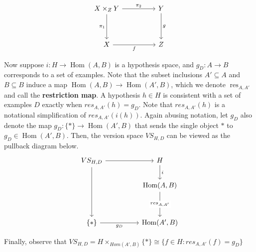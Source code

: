 \documentclass{article}
\theoremstyle{definition}
\begin{document}
\[\begin{tikzcd}
	{X\times_Z Y} && Y \\
	\\
	X && Z
	\arrow["{\pi_2}", from=1-1, to=1-3]
	\arrow["{\pi_1}"', from=1-1, to=3-1]
	\arrow["f"', from=3-1, to=3-3]
	\arrow["g", from=1-3, to=3-3]
\end{tikzcd}\]

Now suppose $i:H \rightarrow \operatorname{Hom}(A,B)$ is a hypothesis space, and $g_D: A\rightarrow B$ corresponds to a set of examples. Note that the subset inclusions $A' \subseteq A$ and $B \subseteq B$ induce a map $\operatorname{Hom}(A,B) \rightarrow \operatorname{Hom}(A',B)$, which we denote $\operatorname{res}_{A,A'}$ and call the \textbf{restriction map}. A hypothesis $h \in H$ is consistent with a set of examples $D$ exactly when $res_{A,A'}(h) = g_D$. Note that $res_{A,A'}(h)$ is a notational simplification of $res_{A,A'}(i(h))$. Again abusing notation, let $g_D$ also denote the map $g_D: \{*\}\rightarrow \operatorname{Hom}(A',B)$ that sends the single object $*$ to $g_D \in \operatorname{Hom}(A', B)$. Then, the version space $VS_{H,D}$ can be viewed as the pullback diagram below. 
\[\begin{tikzcd}
	{VS_{H,D}} && H \\
	 && {\operatorname{Hom}(A,B)} \\
	\\
	\{*\} && {\operatorname{Hom}(A', B)}
	\arrow[from=1-1, to=4-1]
	\arrow["{g_D}"', from=4-1, to=4-3]
	\arrow[from=1-1, to=1-3]
	\arrow["{res_{A,A'}}"{description}, from=2-3, to=4-3]
	\arrow["i", from=1-3, to=2-3]
\end{tikzcd}\]

Finally, observe that $VS_{H,D} = H\times_{Hom(A',B)} \{*\} \cong  \{f\in H : res_{A, A'}(f) = g_D\}$ 

\end{document}
